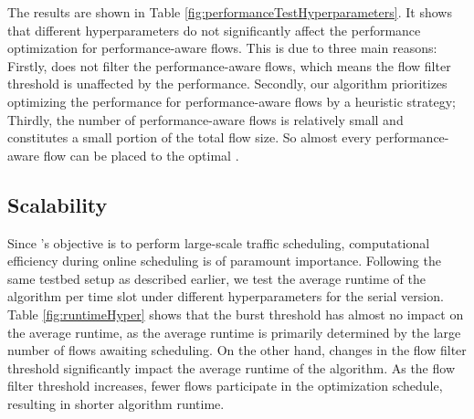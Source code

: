 The results are shown in Table \ref{fig:performanceTestHyperparameters}. It shows that different hyperparameters do not significantly affect the performance optimization for performance-aware flows. This is due to three main reasons: Firstly, {\sys} does not filter the performance-aware flows, which means the flow filter threshold is unaffected by the performance. Secondly, our algorithm prioritizes optimizing the performance for performance-aware flows by a heuristic strategy; Thirdly, the number of performance-aware flows is relatively small and constitutes a small portion of the total flow size. So almost every performance-aware flow can be placed to the optimal {\egress}.

\fi

\subsection{Scalability}
Since {\sys}'s objective is to perform large-scale traffic scheduling, computational efficiency during online scheduling is of paramount importance. Following the same testbed setup as described earlier, we test the average runtime of the algorithm per time slot under different hyperparameters for the serial version. Table \ref{fig:runtimeHyper} shows that the burst threshold has almost no impact on the average runtime, as the average runtime is primarily determined by the large number of flows awaiting scheduling. On the other hand, changes in the flow filter threshold significantly impact the average runtime of the algorithm. As the flow filter threshold increases, fewer flows participate in the optimization schedule, resulting in shorter algorithm runtime.

\begin{table}[tbp]
	\centering
    \vspace{-0.1in}
	\caption{\small The impact of varying hyperparameters on the algorithm's runtime under a single thread (in milliseconds), with "BW PCT." representing the percentage of remaining bandwidth after filtering and "Number PCT." denoting the percentage of the number of flows remaining after filtering.}
	\label{fig:runtimeHyper}
\end{table}


